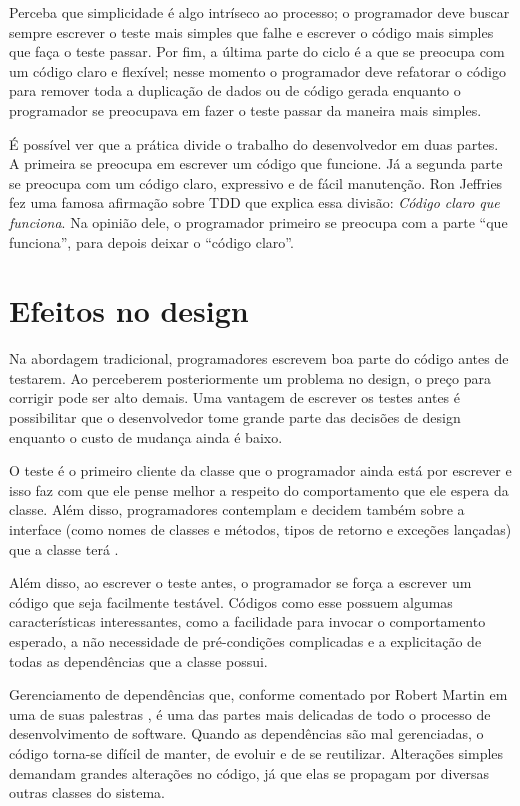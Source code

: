 Perceba que simplicidade é algo intríseco ao processo; o programador deve buscar
sempre escrever o teste mais simples que falhe e escrever o código mais simples
que faça o teste passar. Por fim, a última parte do ciclo é a que se preocupa
com um código claro e flexível; nesse momento o programador deve refatorar o
código para remover toda a duplicação de dados ou de código gerada enquanto o
programador se preocupava em fazer o teste passar da maneira mais simples.

É possível ver que a prática divide o trabalho do desenvolvedor em duas partes.
A primeira se preocupa em escrever um código que funcione. Já a segunda parte
se preocupa com um código claro, expressivo e de fácil manutenção. Ron Jeffries
fez uma famosa afirmação sobre TDD que explica essa divisão: \textit{Código
claro que funciona}. Na opinião dele, o programador primeiro se preocupa com a
parte ``que funciona'', para depois deixar o ``código claro''.

\section{Efeitos no design}

Na abordagem tradicional, programadores escrevem boa parte do código antes de
testarem. Ao perceberem posteriormente um problema no design, o preço para
corrigir pode ser alto demais. Uma vantagem de escrever os testes antes é
possibilitar que o desenvolvedor tome grande parte das decisões de design
enquanto o custo de mudança ainda é baixo.

O teste é o primeiro cliente da
classe que o programador ainda está por escrever e isso faz com que ele pense
melhor a respeito do comportamento que ele espera da classe. Além disso,
programadores contemplam e decidem também sobre a interface (como nomes de
classes e métodos, tipos de retorno e exceções lançadas) que a classe terá
\cite{tdd-influence}.

Além disso, ao escrever o teste antes, o programador se força a escrever um
código que seja facilmente testável. Códigos como esse possuem algumas
características interessantes, como a facilidade para invocar o comportamento
esperado, a não necessidade de pré-condições complicadas e a explicitação de
todas as dependências que a classe possui.

Gerenciamento de dependências que, conforme comentado por Robert Martin em uma
de suas palestras \cite{bobmartin-infoq}, é uma das partes mais delicadas de
todo o processo de desenvolvimento de software. Quando as dependências são mal
gerenciadas, o código torna-se difícil de manter, de evoluir e de se reutilizar.
Alterações simples demandam grandes alterações no código, já que elas se
propagam por diversas outras classes do sistema.

